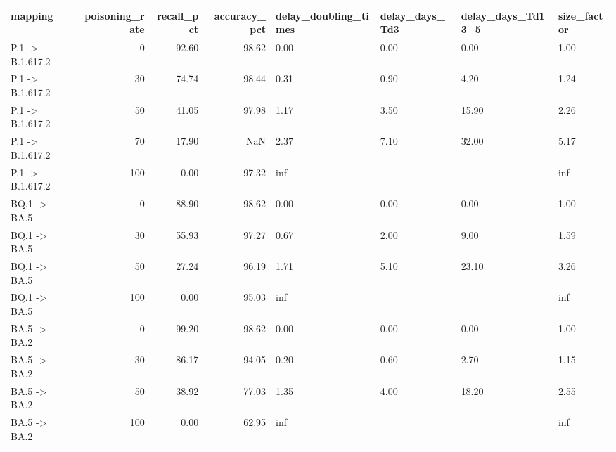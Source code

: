 \begin{tabular}{lrrrllll}
\toprule
mapping & poisoning\_rate & recall\_pct & accuracy\_pct & delay\_doubling\_times & delay\_days\_Td3 & delay\_days\_Td13\_5 & size\_factor \\
\midrule
P.1 -> B.1.617.2 & 0 & 92.60 & 98.62 & 0.00 & 0.00 & 0.00 & 1.00 \\
P.1 -> B.1.617.2 & 30 & 74.74 & 98.44 & 0.31 & 0.90 & 4.20 & 1.24 \\
P.1 -> B.1.617.2 & 50 & 41.05 & 97.98 & 1.17 & 3.50 & 15.90 & 2.26 \\
P.1 -> B.1.617.2 & 70 & 17.90 & NaN & 2.37 & 7.10 & 32.00 & 5.17 \\
P.1 -> B.1.617.2 & 100 & 0.00 & 97.32 & inf &  &  & inf \\
BQ.1 -> BA.5 & 0 & 88.90 & 98.62 & 0.00 & 0.00 & 0.00 & 1.00 \\
BQ.1 -> BA.5 & 30 & 55.93 & 97.27 & 0.67 & 2.00 & 9.00 & 1.59 \\
BQ.1 -> BA.5 & 50 & 27.24 & 96.19 & 1.71 & 5.10 & 23.10 & 3.26 \\
BQ.1 -> BA.5 & 100 & 0.00 & 95.03 & inf &  &  & inf \\
BA.5 -> BA.2 & 0 & 99.20 & 98.62 & 0.00 & 0.00 & 0.00 & 1.00 \\
BA.5 -> BA.2 & 30 & 86.17 & 94.05 & 0.20 & 0.60 & 2.70 & 1.15 \\
BA.5 -> BA.2 & 50 & 38.92 & 77.03 & 1.35 & 4.00 & 18.20 & 2.55 \\
BA.5 -> BA.2 & 100 & 0.00 & 62.95 & inf &  &  & inf \\
\bottomrule
\end{tabular}


